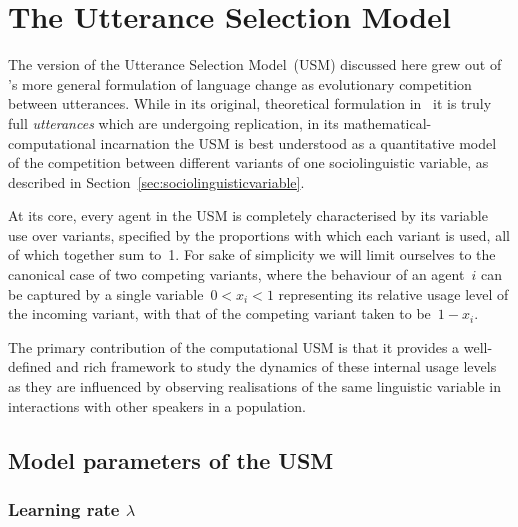 \section{The Utterance Selection Model}
\label{sec:usm}


The version of the Utterance Selection Model~(USM) discussed here grew out of \citeauthor{Croft2000}'s more general formulation of language change as evolutionary competition between utterances. While in its original, theoretical formulation in~\citet{Croft2000} it is truly full \emph{utterances} which are undergoing replication, in its mathematical-computational incarnation the USM is best understood as a quantitative model of the competition between different variants of one sociolinguistic variable, as described in Section~\ref{sec:sociolinguisticvariable}.

At its core, every agent in the USM is completely characterised by its variable use over variants, specified by the proportions with which each variant is used, all of which together sum to~1. For sake of simplicity we will limit ourselves to the canonical case of two competing variants, where the behaviour of an agent~$i$ can be captured by a single variable~$0<x_i<1$ representing its relative usage level of the incoming variant, with that of the competing variant taken to be~$1-x_i$.

The primary contribution of the computational USM is that it provides a well-defined and rich framework to study the dynamics of these internal usage levels as they are influenced by observing realisations of the same linguistic variable in interactions with other speakers in a population. %

\subsection{Model parameters of the USM}

\subsubsection{Learning rate $\lambda$}

